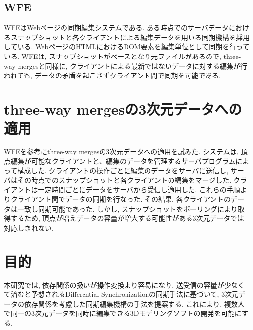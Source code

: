 \subsection{WFE}
WFE\cite{WFE}はWebページの同期編集システムである. ある時点でのサーバデータにおけるスナップショットと各クライアントによる編集データを用いる同期機構を採用している. WebページのHTMLにおけるDOM要素を編集単位として同期を行っている. WFEは, スナップショットがベースとなり元ファイルがあるので, three-way mergesと同様に, クライアントによる最新ではないデータに対する編集が行われても, データの矛盾を起こさずクライアント間で同期を可能である.
\section{three-way mergesの3次元データへの適用}
WFEを参考にthree-way mergesの3次元データへの適用を試みた.
システムは, 頂点編集が可能なクライアントと、編集のデータを管理するサーバプログラムによって構成した. クライアントの操作ごとに編集のデータをサーバに送信し, サーバはその時点でのスナップショットと各クライアントの編集をマージした. クライアントは一定時間ごとにデータをサーバから受信し適用した. これらの手順よりクライアント間でデータの同期を行なった. その結果, 各クライアントのデータは一致し同期可能であった. しかし, スナップショットをポーリングにより取得するため, 頂点が増えデータの容量が増大する可能性がある3次元データでは対応しきれない.
\section{目的}
本研究では, 依存関係の扱いが操作変換より容易になり, 送受信の容量が少なくて済むと予想されるDifferential Synchronizationの同期手法に基づいて, 3次元データの依存関係を考慮した同期編集機構の手法を提案する.
これにより, 複数人で同一の3次元データを同時に編集できる3Dモデリングソフトの開発を可能にする.
